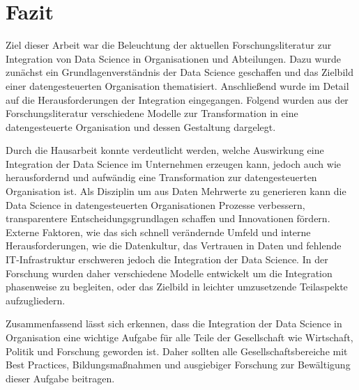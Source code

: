 \chapter[Fazit]{Fazit}
Ziel dieser Arbeit war die Beleuchtung der aktuellen Forschungsliteratur zur Integration von Data Science in Organisationen und Abteilungen.
Dazu wurde zunächst ein Grundlagenverständnis der Data Science geschaffen und das Zielbild einer datengesteuerten Organisation thematisiert.
Anschließend wurde im Detail auf die Herausforderungen der Integration eingegangen.
Folgend wurden aus der Forschungsliteratur verschiedene Modelle zur Transformation in eine datengesteuerte Organisation und dessen Gestaltung dargelegt.

Durch die Hausarbeit konnte verdeutlicht werden, welche Auswirkung eine Integration der Data Science im Unternehmen erzeugen kann, jedoch auch wie herausfordernd und aufwändig eine Transformation zur datengesteuerten Organisation ist.
Als Disziplin um aus Daten Mehrwerte zu generieren kann die Data Science in datengesteuerten Organisationen Prozesse verbessern, transparentere Entscheidungsgrundlagen schaffen und Innovationen fördern.
Externe Faktoren, wie das sich schnell verändernde Umfeld und interne Herausforderungen, wie die Datenkultur, das Vertrauen in Daten und fehlende IT-Infrastruktur erschweren jedoch die Integration der Data Science.
In der Forschung wurden daher verschiedene Modelle entwickelt um die Integration phasenweise zu begleiten, oder das Zielbild in leichter umzusetzende Teilaspekte aufzugliedern. 

Zusammenfassend lässt sich erkennen, dass die Integration der Data Science in Organisation eine wichtige Aufgabe für alle Teile der Gesellschaft wie Wirtschaft, Politik und Forschung geworden ist.
Daher sollten alle Gesellschaftsbereiche mit Best Practices, Bildungsmaßnahmen und ausgiebiger Forschung zur Bewältigung dieser Aufgabe beitragen.